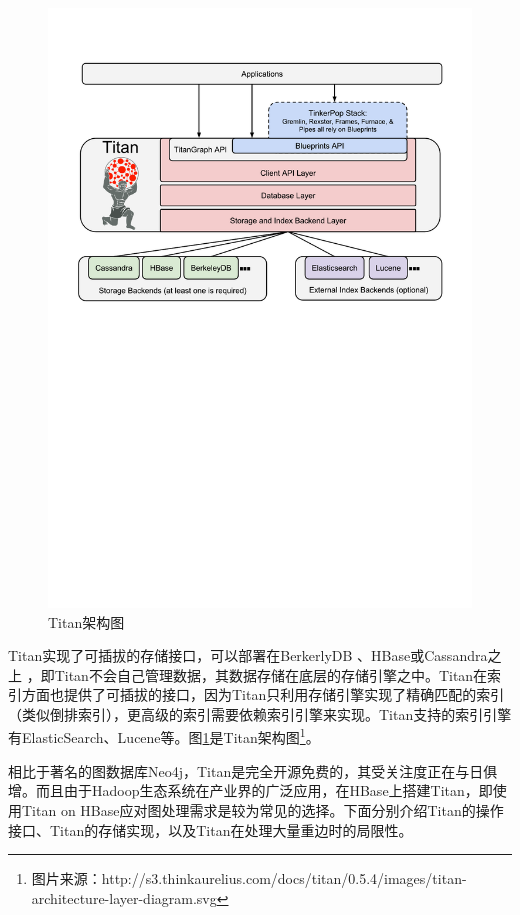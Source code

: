 \begin{figure}[htbp]
\centering
\includegraphics[width=140mm]{fig/titan-architecture.pdf}
\caption{Titan架构图}
\label{fig:titan_arch}
\end{figure}

Titan实现了可插拔的存储接口，可以部署在BerkerlyDB 、HBase或Cassandra之上 ，即Titan不会自己管理数据，其数据存储在底层的存储引擎之中。Titan在索引方面也提供了可插拔的接口，因为Titan只利用存储引擎实现了精确匹配的索引（类似倒排索引），更高级的索引需要依赖索引引擎来实现。Titan支持的索引引擎有ElasticSearch、Lucene等。图\ref{fig:titan_arch}是Titan架构图\footnote{图片来源：http://s3.thinkaurelius.com/docs/titan/0.5.4/images/titan-architecture-layer-diagram.svg}。

相比于著名的图数据库Neo4j，Titan是完全开源免费的，其受关注度正在与日俱增。而且由于Hadoop生态系统在产业界的广泛应用，在HBase上搭建Titan，即使用Titan on HBase应对图处理需求是较为常见的选择。下面分别介绍Titan的操作接口、Titan的存储实现，以及Titan在处理大量重边时的局限性。

